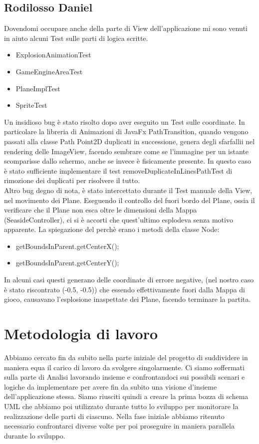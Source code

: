 \documentclass[a4paper,12pt]{report}
\begin{document}
\subsection{Rodilosso Daniel}
Dovendomi occupare anche della parte di View dell’applicazione mi sono venuti in aiuto alcuni Test sulle parti di logica scritte.
\begin{itemize}
	\item ExplosionAnimationTest
	\item GameEngineAreaTest
    \item PlaneImplTest
    \item SpriteTest
\end{itemize}

\noindent Un insidioso bug è stato risolto dopo aver eseguito un Test sulle coordinate.
In particolare la libreria di Animazioni di JavaFx PathTransition, quando vengono passati alla 
classe Path Point2D duplicati in successione, genera degli sfarfallii nel rendering delle ImageView, facendo sembrare come se l’immagine per un istante scomparisse dallo schermo, anche se invece è fisicamente presente.
In questo caso è stato sufficiente implementare il test removeDuplicateInLinesPathTest
di rimozione dei duplicati per risolvere il tutto.
\\
Altro bug degno di nota, è stato intercettato durante il Test manuale della View, nel movimento dei Plane.
Eseguendo il controllo del fuori bordo del Plane, ossia il verificare che il Plane non esca oltre le dimensioni della 
Mappa (SeasideController), ci si è accorti che quest’ultimo esplodeva senza motivo apparente.
La spiegazione del perchè erano i metodi della classe Node:
\begin{itemize}
    \item getBoundsInParent.getCenterX();
    \item getBoundsInParent.getCenterY();
\end{itemize}

\noindent In alcuni casi questi generano delle coordinate di errore negative, (nel nostro caso è stato riscontrato 
(-0.5, -0.5)) che essendo effettivamente fuori dalla Mappa di gioco, causavano l’esplosione inaspettate dei Plane, facendo terminare la partita.

\section{Metodologia di lavoro}
Abbiamo cercato fin da subito nella parte iniziale del progetto di suddividere in maniera equa il carico di lavoro da svolgere singolarmente.
Ci siamo soffermati sulla parte di Analisi lavorando insieme e confrontandoci sui possibili scenari e logiche da implementare per avere fin da subito una visione d’insieme dell’applicazione stessa.
Siamo riusciti quindi a creare la prima bozza di schema UML che abbiamo poi utilizzato durante tutto lo sviluppo per monitorare la realizzazione delle parti di ciascuno.
Nella fase iniziale abbiamo ritenuto necessario confrontarci diverse volte per poi proseguire in maniera parallela durante lo sviluppo.
\end{document}
